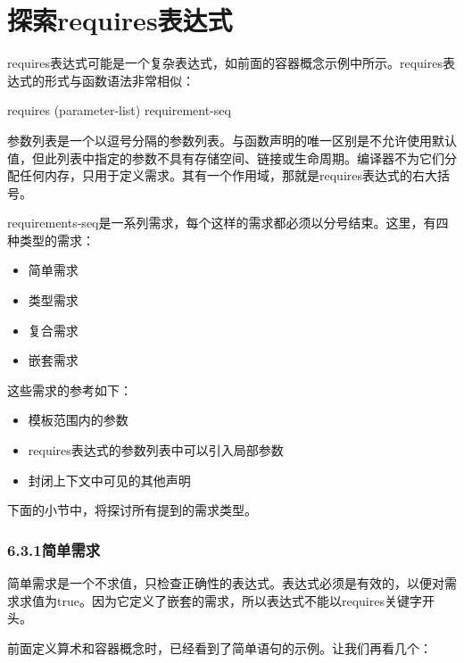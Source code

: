 \section{探索requires表达式}

requires表达式可能是一个复杂表达式，如前面的容器概念示例中所示。requires表达式的形式与函数语法非常相似：

\begin{cpp}
requires (parameter-list) { requirement-seq }
\end{cpp}

参数列表是一个以逗号分隔的参数列表。与函数声明的唯一区别是不允许使用默认值，但此列表中指定的参数不具有存储空间、链接或生命周期。编译器不为它们分配任何内存，只用于定义需求。其有一个作用域，那就是requires表达式的右大括号。

requirements-seq是一系列需求，每个这样的需求都必须以分号结束。这里，有四种类型的需求：

\begin{itemize}
\item
简单需求

\item
类型需求

\item
复合需求

\item
嵌套需求
\end{itemize}

这些需求的参考如下：

\begin{itemize}
\item
模板范围内的参数

\item
requires表达式的参数列表中可以引入局部参数

\item
封闭上下文中可见的其他声明
\end{itemize}

下面的小节中，将探讨所有提到的需求类型。

\subsubsection{6.3.1\hspace{0.2cm}简单需求}

简单需求是一个不求值，只检查正确性的表达式。表达式必须是有效的，以便对需求求值为true。因为它定义了嵌套的需求，所以表达式不能以requires关键字开头。

前面定义算术和容器概念时，已经看到了简单语句的示例。让我们再看几个：


